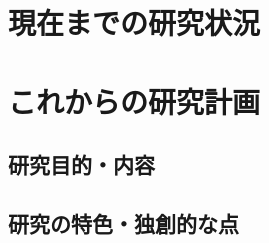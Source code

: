 \documentclass[11pt,a4paper,uplatex,twoside,dvipdfmx]{ujarticle} 	%
\newcommand{\研究課題名}{\mgfamily ストカスティックインフレーション, 原始ブラックホール, および重力波観測}
\newcommand{\研究機関名}{\mgfamily 名古屋大学}
\newcommand{\申請者氏名}{\mgfamily 多田 祐一郎}
\newcommand{\研究代表者氏名}{\申請者氏名}
\newcommand{\研究期間の最終元号年度}{34}	%
\begin{document}
\mgfamily\sffamily

\section{現在までの研究状況}
\newcommand{\現在までの研究状況}{%
	

	

}

\section{これからの研究計画}
\subsection{研究目的・内容}
\subsection{研究の特色・独創的な点}
\newcommand{\研究の特色と独創的な点}{%
}
\end{document}
